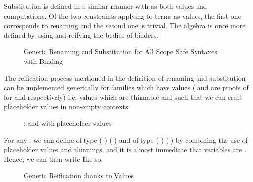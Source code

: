 Substitution is defined in a similar manner with  as both
values and computations. Of the two constraints applying to terms as
values, the first one corresponds to renaming and the second
one is trivial. The algebra is once more defined by using 
and reifying the bodies of binders.

\begin{figure}[h]
\begin{minipage}{0.5\textwidth}
\end{minipage}\hfill
\begin{minipage}{0.5\textwidth}
\end{minipage}
\caption{Generic Renaming and Substitution for All Scope Safe Syntaxes with Binding}
\end{figure}

The reification process mentioned in the definition of renaming
and substitution can be implemented generically for \semrec{}
families which have  values ( and 
are proofs of  for  and  respectively) i.e.
values which are thinnable and such that we can craft placeholder values
in non-empty contexts.

\begin{figure}[h]
\caption{:  and with placeholder values}
\end{figure}

For any  , we can define  of
type {( )  ( \AF{++} )} and  of
type {( )  ( \AF{++} )} by combining the use
of placeholder values and thinnings, and it is almost immediate that variables
are . Hence, we can then write  like so:

\begin{figure}[h]
\caption{Generic Reification thanks to  Values}\label{fig:genericreify}
\end{figure}



